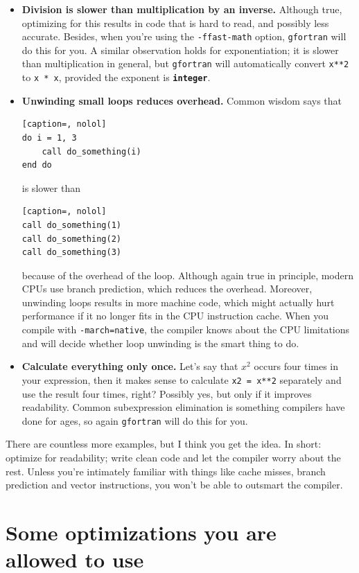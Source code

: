 \documentclass[openany,oneside]{report}
\newcommand{\keyword}[1]{\texttt{\bfseries\color{DarkBlue}#1}}
\begin{document}
\begin{itemize}
  \item\textbf{Division is slower than multiplication by an inverse.} Although true, optimizing for this results in code that is hard to read, and possibly less accurate.
    Besides, when you're using the \texttt{-ffast-math} option, \texttt{gfortran} will do this for you.
    A similar observation holds for exponentiation; it is slower than multiplication in general, but \texttt{gfortran} will automatically convert \texttt{x**2} to \texttt{x * x}, provided the exponent is \keyword{integer}.
  \item\textbf{Unwinding small loops reduces overhead.} Common wisdom says that
\begin{lstlisting}[caption=, nolol]
do i = 1, 3
    call do_something(i)
end do
\end{lstlisting}
    is slower than
\begin{lstlisting}[caption=, nolol]
call do_something(1)
call do_something(2)
call do_something(3)
\end{lstlisting}
    because of the overhead of the loop.
    Although again true in principle, modern CPUs use branch prediction, which reduces the overhead.
    Moreover, unwinding loops results in more machine code, which might actually hurt performance if it no longer fits in the CPU instruction cache.
    When you compile with \texttt{-march=native}, the compiler knows about the CPU limitations and will decide whether loop unwinding is the smart thing to do.
  \item\textbf{Calculate everything only once.} Let's say that $x^2$ occurs four times in your expression, then it makes sense to calculate \texttt{x2 = x**2} separately and use the result four times, right? Possibly yes, but only if it improves readability.
    Common subexpression elimination is something compilers have done for ages, so again \texttt{gfortran} will do this for you.
\end{itemize}
There are countless more examples, but I think you get the idea.
In short: optimize for readability; write clean code and let the compiler worry about the rest.
Unless you're intimately familiar with things like cache misses, branch prediction and vector instructions, you won't be able to outsmart the compiler.

\section{Some optimizations you are allowed to use}
\end{document}
